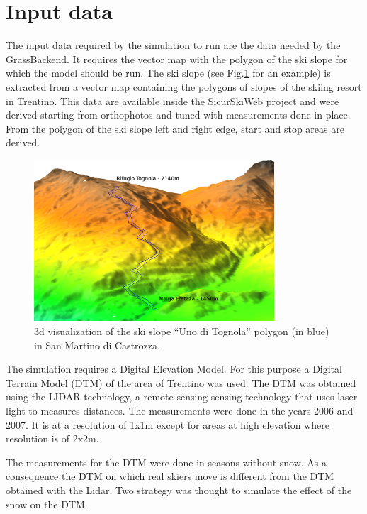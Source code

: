 \documentclass[12pt,a4paper,twoside]{book}
\begin{document}
\section{Input data}
The input data required by the simulation to run are the data needed by the GrassBackend. It requires the vector map with the polygon of the ski slope for which the model should be run. The ski slope (see Fig.\ref{uno_tognola_3d} for an example) is extracted from a vector map containing the polygons of slopes of the skiing resort in Trentino. This data are available inside the SicurSkiWeb project and were derived starting from orthophotos and tuned with measurements done in place. From the polygon of the ski slope left and right edge, start and stop areas are derived.

\begin{figure}
  \begin{center}
    \includegraphics[width=0.8\textwidth]{images/uno_tognola_3d.eps}
    \caption{3d visualization of the ski slope ``Uno di Tognola'' polygon (in blue) in San Martino di Castrozza.}\label{uno_tognola_3d}
  \end{center}
\end{figure}

The simulation requires a Digital Elevation Model. For this purpose a Digital Terrain Model (DTM) of the area of Trentino was used. The DTM was obtained using the LIDAR technology, a remote sensing sensing technology that uses laser light to measures distances. The measurements were done in the years 2006 and 2007. It is at a resolution of 1x1m except for areas at high elevation where resolution is of 2x2m.

The measurements for the DTM were done in seasons without snow. As a consequence the DTM on which real skiers move is different from the DTM obtained with the Lidar. Two strategy was thought to simulate the effect of the snow on the DTM.
\end{document}
